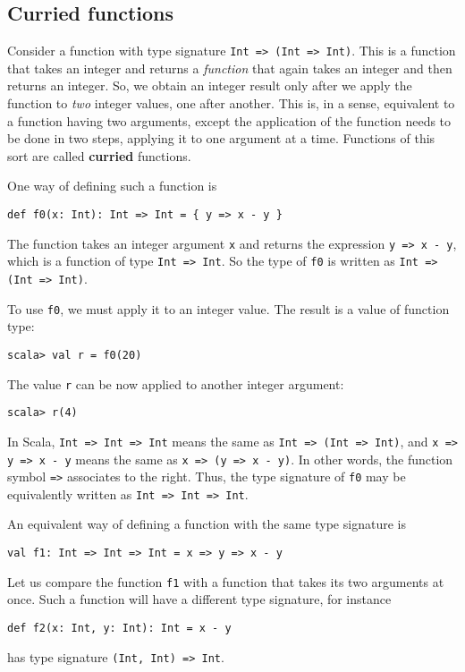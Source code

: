 \subsection{Curried functions}

Consider a function with type signature \lstinline!Int => (Int => Int)!.
This is a function that takes an integer and returns a \emph{function}
that again takes an integer and then returns an integer. So, we obtain
an integer result only after we apply the function to \emph{two} integer
values, one after another. This is, in a sense, equivalent to a function
having two arguments, except the application of the function needs
to be done in two steps, applying it to one argument at a time. Functions
of this sort are called \textbf{curried} functions.

One way of defining such a function is
\begin{lstlisting}
def f0(x: Int): Int => Int = { y => x - y }
\end{lstlisting}

The function takes an integer argument \lstinline!x! and returns
the expression \lstinline!y => x - y!, which is a function of type
\lstinline!Int => Int!. So the type of \lstinline!f0! is written
as \lstinline!Int => (Int => Int)!.

To use \lstinline!f0!, we must apply it to an integer value. The
result is a value of function type:

\begin{lstlisting}
scala> val r = f0(20)
\end{lstlisting}
The value \lstinline!r! can be now applied to another integer argument:
\begin{lstlisting}
scala> r(4)
\end{lstlisting}

In Scala, \lstinline!Int => Int => Int! means the same as \lstinline!Int => (Int => Int)!,
and \lstinline!x => y => x - y! means the same as \lstinline!x => (y => x - y)!.
In other words, the function symbol \lstinline!=>! associates to
the right. Thus, the type signature of \lstinline!f0! may be equivalently
written as \lstinline!Int => Int => Int!.

An equivalent way of defining a function with the same type signature
is
\begin{lstlisting}
val f1: Int => Int => Int = x => y => x - y
\end{lstlisting}

Let us compare the function \lstinline!f1! with a function that takes
its two arguments at once. Such a function will have a different type
signature, for instance
\begin{lstlisting}
def f2(x: Int, y: Int): Int = x - y
\end{lstlisting}
has type signature \lstinline!(Int, Int) => Int!.

